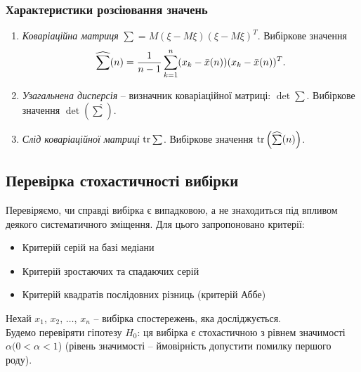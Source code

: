 \subsubsection{Характеристики розсіювання значень}

\begin{enumerate} 
	\item \textit{Коваріаційна матриця} $\sum = M(\xi - M\xi)(\xi - M\xi)^T$. Вибіркове значення \[\widehat{\sum}(n) = \dfrac{1}{n-1} \displaystyle\sum\limits_{k=1}^n (x_k - \bar x(n))(x_k - \bar x(n))^T.\]

	\item \textit{Узагальнена дисперсія} -- визначник коваріаційної матриці: $\det \sum$. Вибіркове значення $\det\left(\widehat{\sum}\right)$.

	\item \textit{Слід коваріаційної матриці} $\operatorname{tr}\sum$. Вибіркове значення $\operatorname{tr}\left(\widehat{\sum}(n)\right)$.
\end{enumerate}

\subsection{Перевірка стохастичності вибірки}

Перевіряємо, чи справді вибірка є випадковою, а не знаходиться під впливом деякого систематичного зміщення. Для цього запропоновано критерії:
\begin{itemize}
	\item Критерій серій на базі медіани
	\item Критерій зростаючих та спадаючих серій
	\item Критерій квадратів послідовних різниць (критерій Аббе)
\end{itemize}

Нехай $x_1$, $x_2$, $\ldots$, $x_n$ -- вибірка спостережень, яка досліджується. \\

Будемо перевіряти гіпотезу $H_0$: ця вибірка є стохастичною з рівнем значимості $\alpha (0 < \alpha < 1$) (рівень значимості -- ймовірність допустити помилку першого роду).

